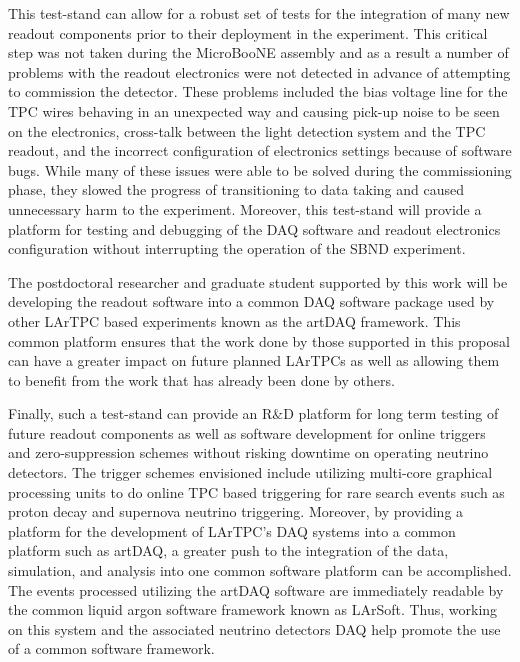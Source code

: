 This test-stand can allow for a robust set of tests for the integration of many new readout components prior to their deployment in the experiment. This critical step was not taken during the MicroBooNE assembly and as a result a number of problems with the readout electronics were not detected in advance of attempting to commission the detector. These problems included the bias voltage line for the TPC wires behaving in an unexpected way and causing pick-up noise to be seen on the electronics, cross-talk between the light detection system and the TPC readout, and the incorrect configuration of electronics settings because of software bugs. While many of these issues were able to be solved during the commissioning phase, they slowed the progress of transitioning to data taking and caused unnecessary harm to the experiment. Moreover, this test-stand will provide a platform for testing and debugging of the DAQ software and readout electronics configuration without interrupting the operation of the SBND experiment. 

The postdoctoral researcher and graduate student supported by this work will be developing the readout software into a common DAQ software package used by other LArTPC based experiments known as the artDAQ framework. This common platform ensures that the work done by those supported in this proposal can have a greater impact on future planned LArTPCs as well as allowing them to benefit from the work that has already been done by others.

Finally, such a test-stand can provide an R$\&$D platform for long term testing of future readout components as well as software development for online triggers and zero-suppression schemes without risking downtime on operating neutrino detectors. The trigger schemes envisioned include utilizing multi-core graphical processing units to do online TPC based triggering for rare search events such as proton decay and supernova neutrino triggering. Moreover, by providing a platform for the development of LArTPC's DAQ systems into a common platform such as artDAQ, a greater push to the integration of the data, simulation, and analysis into one common software platform can be accomplished. The events processed utilizing the artDAQ software are immediately readable by the common liquid argon software framework known as LArSoft. Thus, working on this system and the associated neutrino detectors DAQ help promote the use of a common software framework.


